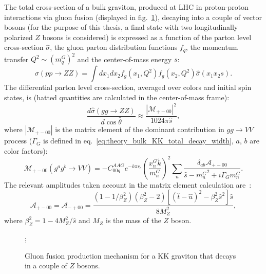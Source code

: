 The total cross-section of a bulk graviton, produced at LHC in proton-proton interactions via gluon fusion (displayed in fig.~\ref{fig:theory_KK_gg_prod}), decaying into a couple of vector bosons (for the purpose of this thesis, a final state with two longitudinally polarized $Z$ bosons is considered) is expressed as a function of the parton level cross-section $\hat{\sigma}$, the gluon parton distribution functions $f_q$, the momentum transfer $Q^2 \sim (m_q^G)^2$ and the center-of-mass energy $s$:
\begin{equation}
\sigma(pp \rightarrow ZZ) = \int dx_1 dx_2 f_g(x_1,Q^2) f_g(x_2, Q^2) \hat{\sigma}(x_1 x_2 s).
\label{eq:theory_cross_section_bulk}
\end{equation}
The differential parton level cross-section, averaged over colors and initial spin states, is (hatted quantities are calculated in the center-of-mass frame):
\begin{equation}
\frac{d \hat{\sigma}(gg \rightarrow ZZ)}{d \cos{\hat{\theta}}} \approx \frac{ \left| \mathcal{M}_{+-00}\right|^2}{1024 \pi \hat{s}},
\label{eq:theory_parton_level_cross_section_bulk}
\end{equation}
where $\left| \mathcal{M}_{+-00}\right|$ is the matrix element of the dominant contribution in $gg \rightarrow VV$ process ($\Gamma_G$ is defined in eq.~\ref{eq:theory_bulk_KK_total_decay_width}, $a$, $b$ are color factors):
\begin{equation}
\mathcal{M}_{+-00} (g^a g^b \rightarrow VV) = -C_{00q}^{AAG} e^{-k \pi r_c} \left( \frac{x^G_n \tilde{k}}{m_n^G}\right)^2 \sum_n \frac{\delta_{ab} \mathcal{A}_{+-00}}{\hat{s} - {m_n^G}^2 +i \Gamma_G m_n^G}.
\label{eq:theory_KK_matrix_elements}
\end{equation}
The relevant amplitudes taken account in the matrix element calculation are~\cite{Agashe:2007zd}:
\begin{equation}
\mathcal{A}_{+-00} = \mathcal{A}_{-+00} = \frac{\left( 1 - 1/\beta_Z^2 \right) \left( \beta_Z^2 -2\right) \left[ (\hat{t} - \hat{u})^2 - \beta_Z^2\hat{s}^2 \right] \hat{s} }{8 M_Z^2},
\label{eq:theory_KK_amplitudes}
\end{equation}
where $\beta_Z^2 = 1- 4M_Z^2/\hat{s}$ and $M_Z$ is the mass of the $Z$ boson.

\begin{figure}[!htb]
  \centering
{};
\caption{Gluon fusion production mechanism for a KK graviton that decays in a couple of $Z$ bosons.}
\label{fig:theory_KK_gg_prod}
\end{figure}

